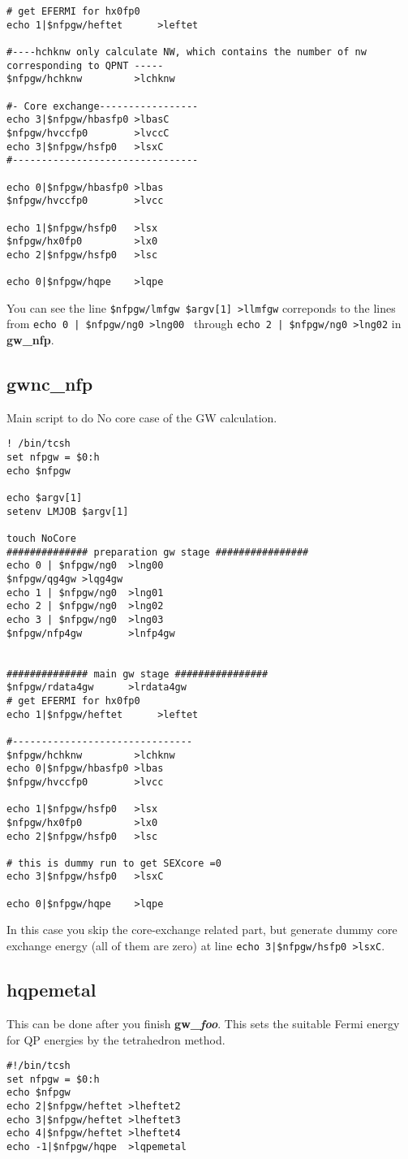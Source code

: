 \documentclass[a4paper,10pt,epsf,fleqn]{article}
\newcommand{\ssx}[1]{\subsection{\bf #1\index{\bf #1}}}
\begin{document}
{{\begin{verbatim}
# get EFERMI for hx0fp0
echo 1|$nfpgw/heftet      >leftet

#----hchknw only calculate NW, which contains the number of nw corresponding to QPNT -----
$nfpgw/hchknw         >lchknw

#- Core exchange-----------------
echo 3|$nfpgw/hbasfp0 >lbasC
$nfpgw/hvccfp0        >lvccC
echo 3|$nfpgw/hsfp0   >lsxC
#--------------------------------

echo 0|$nfpgw/hbasfp0 >lbas
$nfpgw/hvccfp0        >lvcc

echo 1|$nfpgw/hsfp0   >lsx
$nfpgw/hx0fp0         >lx0
echo 2|$nfpgw/hsfp0   >lsc

echo 0|$nfpgw/hqpe    >lqpe
\end{verbatim}}

You can see the line 
{\tt \$nfpgw/lmfgw  \$argv[1]        >llmfgw}
correponds to the lines from 
{\tt echo 0 | \$nfpgw/ng0  >lng00 }
through {\tt echo 2 | \$nfpgw/ng0  >lng02} in {\bf gw\_nfp}.

\ssx{gwnc\_nfp}
Main script to do No core case of the GW calculation.
{\baselineskip=2.6mm
\begin{verbatim}
! /bin/tcsh
set nfpgw = $0:h
echo $nfpgw

echo $argv[1]
setenv LMJOB $argv[1]

touch NoCore
############## preparation gw stage ################
echo 0 | $nfpgw/ng0  >lng00
$nfpgw/qg4gw >lqg4gw
echo 1 | $nfpgw/ng0  >lng01
echo 2 | $nfpgw/ng0  >lng02
echo 3 | $nfpgw/ng0  >lng03
$nfpgw/nfp4gw        >lnfp4gw


############## main gw stage ################
$nfpgw/rdata4gw      >lrdata4gw
# get EFERMI for hx0fp0
echo 1|$nfpgw/heftet      >leftet

#-------------------------------
$nfpgw/hchknw         >lchknw
echo 0|$nfpgw/hbasfp0 >lbas
$nfpgw/hvccfp0        >lvcc

echo 1|$nfpgw/hsfp0   >lsx
$nfpgw/hx0fp0         >lx0
echo 2|$nfpgw/hsfp0   >lsc

# this is dummy run to get SEXcore =0
echo 3|$nfpgw/hsfp0   >lsxC

echo 0|$nfpgw/hqpe    >lqpe
\end{verbatim}}
In this case you skip the core-exchange related part, but generate dummy core exchange energy
(all of them are zero) at line {\tt echo 3|\$nfpgw/hsfp0   >lsxC}.


\ssx{hqpemetal}
This can be done after you finish {\bf gw\_{\it foo}}.
This sets the suitable Fermi energy for QP energies by the tetrahedron method.
{\baselineskip=2.6mm
\begin{verbatim}
#!/bin/tcsh
set nfpgw = $0:h
echo $nfpgw
echo 2|$nfpgw/heftet >lheftet2
echo 3|$nfpgw/heftet >lheftet3
echo 4|$nfpgw/heftet >lheftet4
echo -1|$nfpgw/hqpe  >lqpemetal
\end{verbatim}}


}
\end{document}
